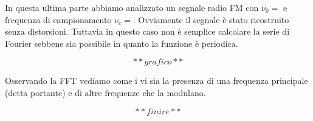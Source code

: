 In questa ultima parte abbiamo analizzato un segnale radio FM con $\nu_0=$ e frequenza di campionamento $\nu_c=$. Ovviamente il segnale è stato ricostruito senza distorsioni. Tuttavia in questo caso non è semplice calcolare la serie di Fourier sebbene sia possibile in quanto la funzione è periodica. 

$$**grafico**$$

Osservando la FFT vediamo come i vi sia la presenza di una frequenza principale (detta portante) e di altre frequenze che la modulano. 

$$**finire**$$





